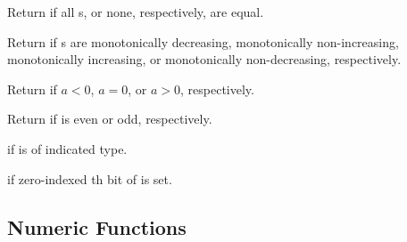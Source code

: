 \begin{LIST}{1cm}

     {
       \index{=}%
       \index{/=}%
       Return \retval{\T} if all s, or
       none, respectively,  are equal.
     }

  {
  Return \retval{\T} if s are
  monotonically decreasing, monotonically non-increasing,
  monotonically increasing, or monotonically non-decreasing, respectively. 
  }

  {
  Return \retval{\T} if $a < 0$, $a = 0$, or $a > 0$, respectively.
  }

  {
    Return \retval{\T} if  is even or odd, respectively.
  }

  {
  \retval{\T} if  is of
  indicated type.
  }

  {
  \retval{\T} if zero-indexed th bit of  is set.
  }


\end{LIST}

\subsection[Numeric~Functns]{Numeric Functions} 

